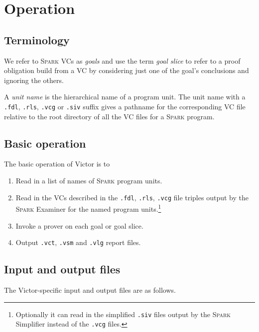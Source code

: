 \documentclass[12pt,fleqn]{article}
\newcommand{\spark}{\textsc{Spark}}
\begin{document}
\section{Operation}
\subsection{Terminology}
We refer to \spark{} VCs as \emph{goals} and use the term \emph{goal
  slice} to refer to a proof obligation build from a VC by considering
just one of the goal's conclusions and ignoring the others.  

A \emph{unit name} is the hierarchical name of a program unit.  The unit
name with a \texttt{.fdl}, 
\texttt{.rls}, 
\texttt{.vcg} or 
\texttt{.siv} suffix gives a pathname for the corresponding
VC file relative to the root directory of all the VC files for a \spark{}
program.

\subsection{Basic operation}


The basic operation of Victor is to 
\begin{enumerate}
\item Read in a list of names of \spark{} program units.
\item Read in the VCs described in the \texttt{.fdl}, \texttt{.rls},
  \texttt{.vcg} file triples output by the \spark{} Examiner for the
  named program units.\footnote{
  Optionally it can read in the simplified
  \texttt{.siv} files output by the \spark{} Simplifier instead of the 
  \texttt{.vcg} files.}
\item Invoke a prover on each goal or goal slice. 
\item 
Output \texttt{.vct}, \texttt{.vsm} and \texttt{.vlg} report files.
\end{enumerate}

\subsection{Input and output files}
The Victor-specific input and output files are as follows.
\end{document}
